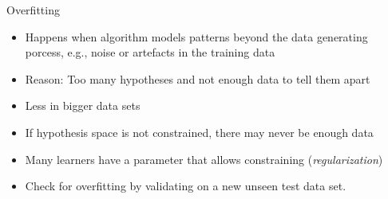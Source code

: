 \documentclass[11pt,compress,t,notes=noshow, xcolor=table]{beamer}
\begin{document}
\begin{vbframe}{Overfitting}
\begin{itemize}
  \item Happens when algorithm models patterns beyond the data generating porcess,
    e.g., noise or artefacts in the training data
  \item Reason: Too many hypotheses and not enough data to tell them apart
  \item Less in bigger data sets
  \item If hypothesis space is not constrained, there may never be enough data
  \item Many learners have a parameter that allows constraining (\textit{regularization})
  \item Check for overfitting by validating on a new unseen test data set.
\end{itemize}

\end{vbframe}



\end{document}
